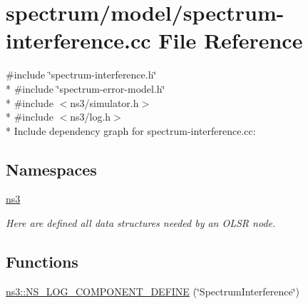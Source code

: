 \hypertarget{spectrum-interference_8cc}{}\section{spectrum/model/spectrum-\/interference.cc File Reference}
\label{spectrum-interference_8cc}
{\ttfamily \#include \char`\"{}spectrum-\/interference.\+h\char`\"{}}\\*
{\ttfamily \#include \char`\"{}spectrum-\/error-\/model.\+h\char`\"{}}\\*
{\ttfamily \#include $<$ns3/simulator.\+h$>$}\\*
{\ttfamily \#include $<$ns3/log.\+h$>$}\\*
Include dependency graph for spectrum-\/interference.cc\+:
\subsection*{Namespaces}
\begin{DoxyCompactItemize}
\item 
 \hyperlink{namespacens3}{ns3}
\begin{DoxyCompactList}\small\item\em Here are defined all data structures needed by an O\+L\+SR node. \end{DoxyCompactList}\end{DoxyCompactItemize}
\subsection*{Functions}
\begin{DoxyCompactItemize}
\item 
\hyperlink{namespacens3_ade056f8707accab8138fdc2d7506df3b}{ns3\+::\+N\+S\+\_\+\+L\+O\+G\+\_\+\+C\+O\+M\+P\+O\+N\+E\+N\+T\+\_\+\+D\+E\+F\+I\+NE} (\char`\"{}Spectrum\+Interference\char`\"{})
\end{DoxyCompactItemize}
